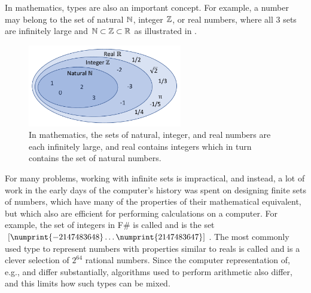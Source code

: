 \documentclass[fsharpNotes.tex]{subfiles}
\begin{document}
In mathematics, types are also an important concept. For example, a number may belong to the set of natural $\mathbb{N}$, integer $\mathbb{Z}$, or real numbers, where all 3 sets are infinitely large and $\mathbb{N}\subset\mathbb{Z}\subset\mathbb{R}$ as illustrated in .
\begin{figure} %
  \centering
  \includegraphics[width=0.6\textwidth]{numbers}
  \caption{In mathematics, the sets of natural, integer, and real numbers are each infinitely large, and real contains integers which in turn contains the set of natural numbers.}
  \label{fig:numbers}
\end{figure}
For many problems, working with infinite sets is impractical, and instead, a lot of work in the early days of the computer's history was spent on designing finite sets of numbers, which have many of the properties of their mathematical equivalent, but which also are efficient for performing calculations on a computer. For example, the set of integers in F\# is called  and is the set $[\numprint{-2147483648} \ldots \numprint{2147483647}]$. The most commonly used type to represent numbers with properties similar to reals is called  and is a clever selection of $2^{64}$ rational numbers. Since the computer representation of, e.g.,  and  differ substantially, algorithms used to perform arithmetic also differ, and this limits how such types can be mixed.
\end{document}
